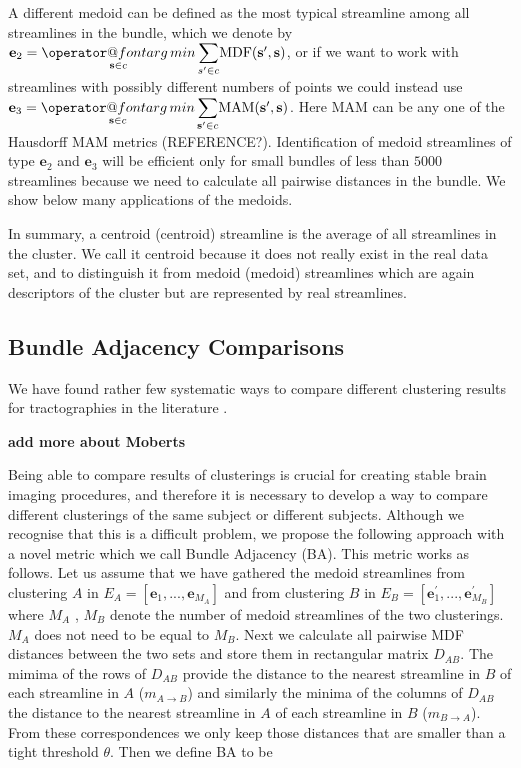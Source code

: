\documentclass{bioinfo}
\makeatletter
\def\argmin{\mathop{\operator@font arg\,min}}
\makeatother
\begin{document}
\begin{methods}
A different medoid can be defined as the most typical streamline among
all streamlines in the bundle, which we denote by
$\mathbf{e}_{2}={\displaystyle \argmin_{\mathbf{s} \in
    c}}\,{\displaystyle \sum_{s'\in
    c}}\mathrm{MDF}(\mathbf{s'},\mathbf{s})$, or if we want to work with
streamlines with possibly different numbers of points we could instead
use $\mathbf{e}_{3}={\displaystyle \argmin_{\mathbf{s} \in
    c}}\,{\displaystyle \sum_{\mathbf{s'}\in
    c}}\mathrm{MAM}(\mathbf{s'},\mathbf{s})$.  Here $\mathrm{MAM}$ can
be any one of the Hausdorff MAM metrics (REFERENCE?).  Identification of
medoid streamlines of type $\mathbf{e}_{2}$ and $\mathbf{e}_{3}$ will
be efficient only for small bundles of less than $5000$ streamlines
because we need to calculate all pairwise distances in the bundle. We
show below many applications of the medoids.

In summary, a centroid (centroid) streamline is the average of all
streamlines in the cluster. We call it centroid because it does not
really exist in the real data set, and to distinguish it from medoid
(medoid) streamlines which are again descriptors of the cluster but are
represented by real streamlines.

\subsection{Bundle Adjacency Comparisons\label{sub:Tightness-comparisons-1}}

We have found rather few systematic ways to compare different clustering
results for tractographies in the literature
\citep{moberts2005evaluation}.  

\textbf{add more about Moberts}

Being able to compare results of clusterings is crucial for creating
stable brain imaging procedures, and therefore it is necessary to
develop a way to compare different clusterings of the same subject or
different subjects. Although we recognise that this is a difficult
problem, we propose the following approach with a novel metric which we
call Bundle Adjacency (BA). This metric works as follows. Let us assume
that we have gathered the medoid streamlines from clustering $A$ in
$E_{A}=[\mathbf{e}_{1},...,\mathbf{e}_{M_{A}}]$ and from clustering $B$
in $E_{B}=[\mathbf{e}_{1}^{'},...,\mathbf{e}_{M_{B}}^{'}]$ where $M_A$ ,
$M_B$ denote the number of medoid streamlines of the two
clusterings. $M_{A}$ does not need to be equal to $M_{B}$. Next we
calculate all pairwise MDF distances between the two sets and store them
in rectangular matrix $D_{AB}$. The mimima of the rows of $D_{AB}$
provide the distance to the nearest streamline in $B$ of each streamline
in $A$ ($m_{A\rightarrow B}$) and similarly the minima of the columns of
$D_{AB}$ the distance to the nearest streamline in $A$ of each
streamline in $B$ ($m_{B\rightarrow A}$). From these correspondences we
only keep those distances that are smaller than a tight threshold
$\theta$. Then we define BA to be


\end{methods}
\end{document}
